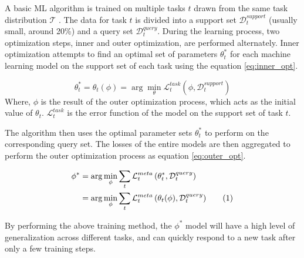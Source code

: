 \documentclass[aps,prb,groupedaddress,twocolumn,showpacs,dvipdfmx,superscriptaddress,pdftex]{revtex4-2}
\newcommand\numberthis{\addtocounter{equation}{1}\tag{\theequation}}
\begin{document}
A basic ML algorithm is trained on multiple tasks $t$ drawn from the same task distribution $\mathcal{T}$ \cite{hospedales2021meta}. The data for task $t$ is divided into a support set $\mathcal{D}_t^{support}$ (usually small, around 20\%) and a query set $\mathcal{D}_t^{query}$. During the learning process, two optimization steps, inner and outer optimization, are performed alternately. Inner optimization attempts to find an optimal set of parameters $\theta_t^*$ for each machine learning model on the support set of each task using the equation \ref{eq:inner_opt}.

\begin{equation}
    \theta_t^* = \theta_t(\phi) = \arg\min_{\theta}{\mathcal{L}^{task}_t\left( \phi, \mathcal{D}_t^{support} \right)}
    \label{eq:inner_opt}
\end{equation} Where, $\phi$ is the result of the outer optimization process, which acts as the initial value of $\theta_t$. $\mathcal{L}^{task}_t$ is the error function of the model on the support set of task $t$.

\vspace{2mm}


The algorithm then uses the optimal parameter sets $\theta_t^*$ to perform on the corresponding query set. The losses of the entire models are then aggregated to perform the outer optimization process as equation \ref{eq:outer_opt}.

\begin{align*}
    \phi^* &= \arg\min_{\phi}\sum_{t}{\mathcal{L}^{meta}_t\left( \theta_t^*, \mathcal{D}_t^{query} \right)}\\
    &= \arg\min_{\phi}\sum_{t}{\mathcal{L}^{meta}_t\left( \theta_t(\phi), \mathcal{D}_t^{query} \right)} \numberthis
    \label{eq:outer_opt}
\end{align*}


By performing the above training method, the $\phi^*$ model will have a high level of generalization across different tasks, and can quickly respond to a new task after only a few training steps.
\end{document}
